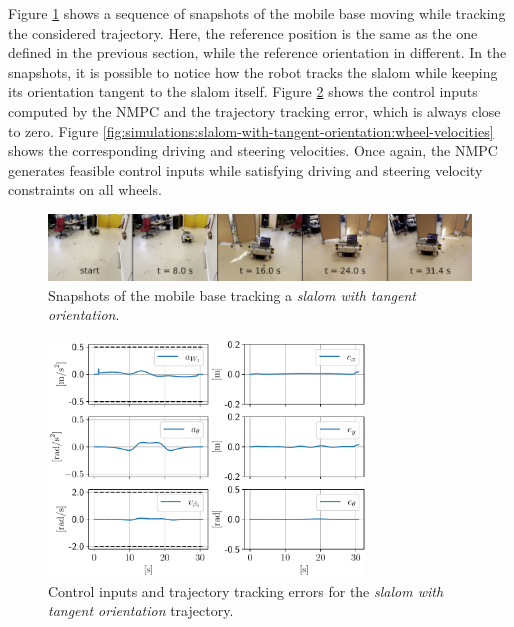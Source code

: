 Figure \ref{fig:experiments:slalom-with-tangent-orientation:snapshots} shows a sequence of snapshots of the mobile base moving while tracking the considered trajectory. Here, the reference position is the same as the one defined in the previous section, while the reference orientation in different. In the snapshots, it is possible to notice how the robot tracks the slalom while keeping its orientation tangent to the slalom itself. Figure \ref{fig:simulations:slalom-with-tangent-orientation:inputs-and-errors} shows the control inputs computed by the NMPC and the trajectory tracking error, which is always close to zero. Figure \ref{fig:simulations:slalom-with-tangent-orientation:wheel-velocities} shows the corresponding driving and steering velocities. Once again, the NMPC generates feasible control inputs while satisfying driving and steering velocity constraints on all wheels.
\begin{figure}
    \centering
    \includegraphics[width=\textwidth]{figures/SWMR/simulations/slalom_with_tangent_orientation/snapshots.jpeg}
    \caption{Snapshots of the mobile base tracking a \textit{slalom with tangent orientation}.}
    \label{fig:experiments:slalom-with-tangent-orientation:snapshots}
\end{figure}
\begin{figure}
    \centering
    \includegraphics[width=0.75\textwidth]{figures/SWMR/simulations/slalom_with_tangent_orientation/inputs_and_errors.pdf}
    \caption{Control inputs and trajectory tracking errors for the \textit{slalom with tangent orientation} trajectory.}
    \label{fig:simulations:slalom-with-tangent-orientation:inputs-and-errors}
\end{figure}
